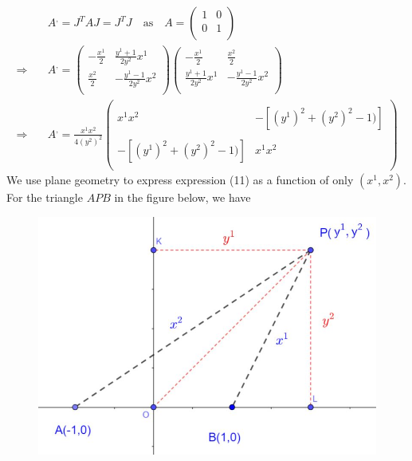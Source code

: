 \begin{align}
\ & A^, = J^TAJ =J^TJ \quad \text{as}\quad A = \begin{pmatrix}
1 &0 \\
0& 1 \\
\end{pmatrix}\\
\Rightarrow\quad & A^, = \begin{pmatrix}
-\frac{x^1}{2} & \frac{y^1+1}{2y^2}x^1 \\
\frac{x^2}{2} & -\frac{y^1-1}{2y^2}x^2 \\
\end{pmatrix}\begin{pmatrix}
-\frac{x^1}{2} &\frac{x^2}{2}  \\
\frac{y^1+1}{2y^2}x^1 & -\frac{y^1-1}{2y^2}x^2 \\
\end{pmatrix}\\
\Rightarrow\quad & A^, =\frac{x^1x^2}{4(y^2)^2} \begin{pmatrix}
\ & \\
x^1x^2 &-\left[(y^1)^2 +(y^2)^2-1)\right] \\\\
-\left[(y^1)^2 +(y^2)^2-1)\right]  &x^1x^2\\
\ & 
\end{pmatrix}
\end{align}
We use plane geometry to express expression (11) as  a function of only $(x^1,x^2)$. For the triangle $APB$ in the figure below, we have
\begin{figure}[h]
\centering
\begin{minipage}[t]{.5\textwidth}
\vspace{0pt}
\includegraphics[scale=.4]{Bipolar2.jpg}
\end{minipage}\hfill
\end{figure}
